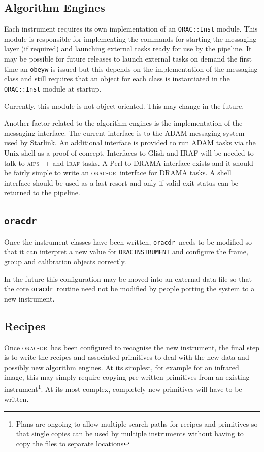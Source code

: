\documentclass[twoside,11pt]{article}
\renewcommand{\_}{\texttt{\symbol{95}}}
\newcommand{\Oracdr}{\textsc{orac-dr}}
\newcommand{\oracdr}{\texttt{oracdr}}
\begin{document}
\subsection{Algorithm Engines}

Each instrument requires its own implementation of an
\texttt{ORAC::Inst} module. This module is responsible for
implementing the commands for starting the messaging layer (if
required) and launching external tasks ready for use by the
pipeline. It may be possible for future releases to launch
external tasks on demand the first time an \texttt{obeyw} is
issued but this depends on the implementation of the messaging class and 
still requires that an object for each class is instantiated in the
\texttt{ORAC::Inst} module at startup.

Currently, this module is not object-oriented. This may change in the
future.

Another factor related to the algorithm engines is the implementation
of the messaging interface. The current interface is to the 
ADAM messaging system used by Starlink. An additional interface is
provided to run ADAM tasks via the Unix shell as a proof of concept.
Interfaces to Glish and IRAF will be needed to talk to \textsc{aips++}
and \textsc{Iraf} tasks. A Perl-to-DRAMA interface exists and it
should be fairly simple to write an \Oracdr\ interface for
DRAMA tasks. A shell interface should be used as a last
resort and only if valid exit status can be returned to the pipeline.



\subsection{\oracdr}

Once the instrument classes have been written, \oracdr\ needs to be
modified so that it can interpret a new value for
\texttt{ORAC\_INSTRUMENT} and configure the frame, group and
calibration objects correctly.

In the future this configuration may be moved into an external data
file so that the core \oracdr\ routine need not be modified by people
porting the system to a new instrument.

\subsection{Recipes}

Once \Oracdr\ has been configured to recognise the new instrument, the 
final step is to write the recipes and associated primitives to deal
with the new data and possibly new algorithm engines. At its simplest, 
for example for an infrared image, this may simply require copying
pre-written primitives from an existing instrument\footnote{Plans are
ongoing to allow multiple search paths for recipes and primitives so
that single copies can be used by multiple instruments without having
to copy the files to separate locations}.
At its most complex, completely new primitives will have to be written.
\end{document}
